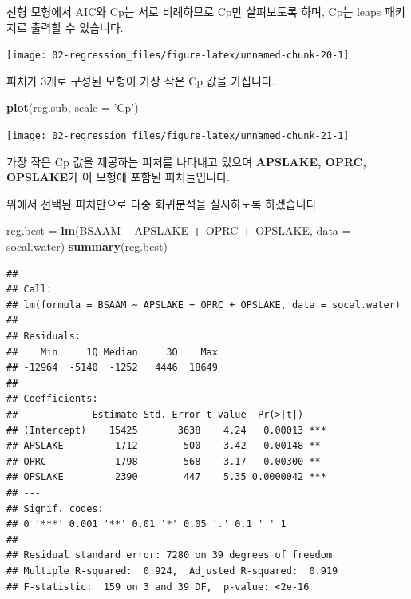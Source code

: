 \documentclass[12pt,]{book}
\newenvironment{Shaded}{\begin{snugshade}}{\end{snugshade}}
\newcommand{\DataTypeTok}[1]{\textcolor[rgb]{0.13,0.29,0.53}{#1}}
\newcommand{\KeywordTok}[1]{\textcolor[rgb]{0.13,0.29,0.53}{\textbf{#1}}}
\newcommand{\NormalTok}[1]{#1}
\newcommand{\OperatorTok}[1]{\textcolor[rgb]{0.81,0.36,0.00}{\textbf{#1}}}
\newcommand{\StringTok}[1]{\textcolor[rgb]{0.31,0.60,0.02}{#1}}
\begin{document}
선형 모형에서 AIC와 Cp는 서로 비례하므로 Cp만 살펴보도록 하며, Cp는 leaps 패키지로 출력할 수 있습니다.

\begin{Shaded}
\end{Shaded}

\begin{center}\texttt{[image: 02-regression\_files/figure-latex/unnamed-chunk-20-1]} \end{center}

피처가 3개로 구성된 모형이 가장 작은 Cp 값을 가집니다.

\begin{Shaded}
\begin{Highlighting}[]
\KeywordTok{plot}\NormalTok{(reg.sub, }\DataTypeTok{scale =} \StringTok{'Cp'}\NormalTok{)}
\end{Highlighting}
\end{Shaded}

\begin{center}\texttt{[image: 02-regression\_files/figure-latex/unnamed-chunk-21-1]} \end{center}

가장 작은 Cp 값을 제공하는 피처를 나타내고 있으며 \textbf{APSLAKE, OPRC, OPSLAKE}가 이 모형에 포함된 피처들입니다.

위에서 선택된 피처만으로 다중 회귀분석을 실시하도록 하겠습니다.

\begin{Shaded}
\begin{Highlighting}[]
\NormalTok{reg.best =}\StringTok{ }\KeywordTok{lm}\NormalTok{(BSAAM }\OperatorTok{~}\StringTok{ }\NormalTok{APSLAKE }\OperatorTok{+}\StringTok{ }\NormalTok{OPRC }\OperatorTok{+}\StringTok{ }\NormalTok{OPSLAKE, }\DataTypeTok{data =}\NormalTok{ socal.water) }
\KeywordTok{summary}\NormalTok{(reg.best)}
\end{Highlighting}
\end{Shaded}

\begin{verbatim}
## 
## Call:
## lm(formula = BSAAM ~ APSLAKE + OPRC + OPSLAKE, data = socal.water)
## 
## Residuals:
##    Min     1Q Median     3Q    Max 
## -12964  -5140  -1252   4446  18649 
## 
## Coefficients:
##             Estimate Std. Error t value  Pr(>|t|)    
## (Intercept)    15425       3638    4.24   0.00013 ***
## APSLAKE         1712        500    3.42   0.00148 ** 
## OPRC            1798        568    3.17   0.00300 ** 
## OPSLAKE         2390        447    5.35 0.0000042 ***
## ---
## Signif. codes:  
## 0 '***' 0.001 '**' 0.01 '*' 0.05 '.' 0.1 ' ' 1
## 
## Residual standard error: 7280 on 39 degrees of freedom
## Multiple R-squared:  0.924,  Adjusted R-squared:  0.919 
## F-statistic:  159 on 3 and 39 DF,  p-value: <2e-16
\end{verbatim}
\end{document}

